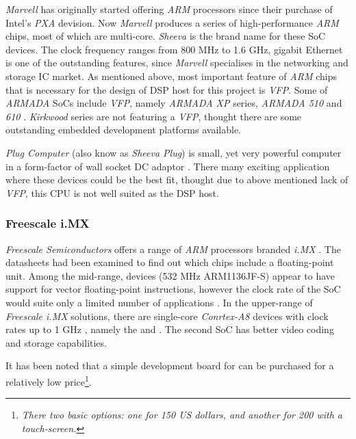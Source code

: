   \emph{Marvell} has originally started offering \emph{ARM} processors
 since their purchase of Intel's \emph{PXA} devision. Now \emph{Marvell}
 produces a series of high-performance \emph{ARM} chips, most of which
 are multi-core. \emph{Sheeva} is the brand name for these SoC devices.
 The clock frequency ranges from 800 MHz to 1.6 GHz, gigabit Ethernet
 is one of the outstanding features, since \emph{Marvell} specialises
 in the networking and storage IC market. As mentioned above, most
 important feature of \emph{ARM} chips that is necessary for the design
 of DSP host for this project is \emph{VFP}. Some of \emph{ARMADA}
 SoCs include \emph{VFP}, namely \emph{ARMADA XP} series,
 \emph{ARMADA 510} and \emph{610} \cite{links:marvell:armada}.
 \emph{Kirkwood} series \cite{links:marvell:kirkwood} are not featuring
 a \emph{VFP}, thought there are some outstanding embedded development
 platforms available.

  \emph{Plug Computer} (also know as \emph{Sheeva Plug}) is small, yet
 very powerful computer in a form-factor of wall socket DC adaptor
 \cite{links:marvell:plug,links:plugcomp:homepage}. There many exciting
 application where these devices could be the best fit, thought due to
 above mentioned lack of \emph{VFP}, this CPU is not well suited as the
 DSP host.


\subsubsection{Freescale i.MX}

 \emph{Freescale Semiconductors} offers a range of \emph{ARM} processors
 branded \emph{i.MX} \cite{links:freescale:imx}. The datasheets had been
 examined to find out which chips include a floating-point unit. Among the
 mid-range,  devices (532 MHz ARM1136JF-S) appear to have
 support for vector floating-point instructions, however the clock rate of
 the  SoC would suite only a limited number of applications
 \cite{links:freescale:imx31}. In the upper-range of \emph{Freescale i.MX}
 solutions, there are single-core \emph{Conrtex-A8} devices with clock rates
 up to 1 GHz \cite{links:freescale:imx5}, namely the   and
 . The second SoC has better video coding and storage
 capabilities.

 It has been noted that a simple development board for  can
 be purchased for a relatively low price\footnote{\emph{There two basic
 options: one for 150 US dollars, and another for 200 with a touch-screen.}}.


